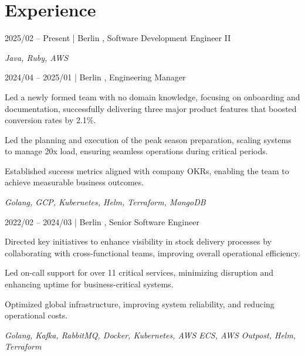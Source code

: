 \section{Experience}

    \begin{twocolentry}{2025/02 -- Present | Berlin}
        , Software Development Engineer II
    \end{twocolentry}
    \begin{onecolentry}
        \textit{Java, Ruby, AWS}
    \end{onecolentry}
    \vspace{0.3cm}

    \begin{twocolentry}{2024/04 -- 2025/01 | Berlin}
        , Engineering Manager
    \end{twocolentry}
    \begin{onecolentry}
        \begin{highlights}
            \item Led a newly formed team with no domain knowledge, focusing on onboarding and documentation, successfully delivering three major product features that boosted conversion rates by 2.1\%.
            \item Led the planning and execution of the peak season preparation, scaling systems to manage 20x load, ensuring seamless operations during critical periods.
            \item Established success metrics aligned with company OKRs, enabling the team to achieve measurable business outcomes.
        \end{highlights}
        \textit{Golang, GCP, Kubernetes, Helm, Terraform, MongoDB}
    \end{onecolentry}
    \vspace{0.3cm}


    \begin{twocolentry}{2022/02 -- 2024/03 | Berlin}
        , Senior Software Engineer
    \end{twocolentry}
    \begin{onecolentry}
        \begin{highlights}
            \item Directed key initiatives to enhance visibility in stock delivery processes by collaborating with cross-functional teams, improving overall operational efficiency.
            \item Led on-call support for over 11 critical services, minimizing disruption and enhancing uptime for business-critical systems.
            \item Optimized global infrastructure, improving system reliability, and reducing operational costs.
        \end{highlights}
        \textit{Golang, Kafka, RabbitMQ, Docker, Kubernetes, AWS ECS, AWS Outpost, Helm, Terraform}
    \end{onecolentry}
    \vspace{0.3cm}


